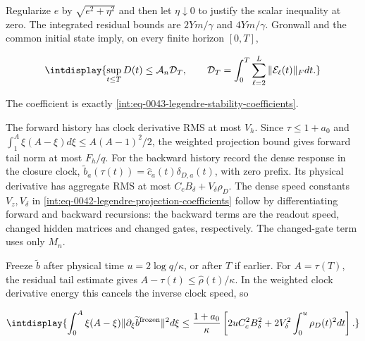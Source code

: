 
Regularize \(e\) by \(\sqrt{e^2+\eta^2}\) and then let \(\eta\downarrow0\) to justify the scalar inequality at zero. The integrated residual bounds are \(2Ym/\gamma\) and \(4Ym/\gamma\). Gronwall and the common initial state imply, on every finite horizon \([0,\allowbreak T]\),


\begingroup\renewcommand{\theHequation}{intdisplay.536}
\begin{equation}
\intdisplay{
\sup_{t\le T}D(t)\le\mathcal A_n\mathcal D_T,
\qquad
\mathcal D_T=\int_0^T\sum_{\ell=2}^L\|\mathcal E_\ell(t)\|_Fdt.
}
\label{int:eq-0225-legendre-signed-stability}
\end{equation}
\endgroup


The coefficient is exactly \eqref{int:eq-0043-legendre-stability-coefficients}.



The forward history has clock derivative RMS at most \(V_h\). Since \(\tau\le1+a_0\) and \(\int_1^A\xi(A-\xi)d\xi\le A(A-1)^2/2\), the weighted projection bound gives forward tail norm at most \(F_h/q\). For the backward history record the dense response in the closure clock, \(\widetilde b_a(\tau(t))=\widehat c_a(t)\delta_{D,\allowbreak a}(t)\), with zero prefix. Its physical derivative has aggregate RMS at most \(C_cB_\delta+V_\delta\rho_D\). The dense speed constants \(V_z,\allowbreak V_\delta\) in \eqref{int:eq-0042-legendre-projection-coefficients} follow by differentiating forward and backward recursions: the backward terms are the readout speed, changed hidden matrices and changed gates, respectively. The changed-gate term uses only \(M_n\).



Freeze \(\widetilde b\) after physical time \(u=2\log q/\kappa\), or after \(T\) if earlier. For \(A=\tau(T)\), the residual tail estimate gives \(A-\tau(t)\le\widehat\rho(t)/\kappa\). In the weighted clock derivative energy this cancels the inverse clock speed, so


\begingroup\renewcommand{\theHequation}{intdisplay.537}
\begin{equation*}
\intdisplay{
\int_0^A\xi(A-\xi)\|\partial_\xi\widetilde b^{\rm frozen}\|^2d\xi
\le\frac{1+a_0}\kappa
\left[2uC_c^2B_\delta^2+
2V_\delta^2\int_0^u\rho_D(t)^2dt\right].
}
\end{equation*}
\endgroup

